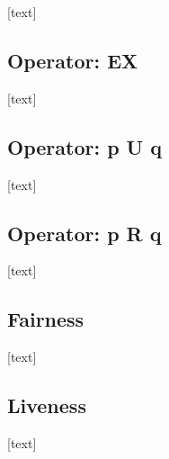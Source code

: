 \documentclass{article}
\begin{document}
		[text]
		
		\subsection{Operator: EX}
				
		[text]
		
		\subsection{Operator: p U q}
				
		[text]
		
		\subsection{Operator: p R q}
				
		[text]
		
		\subsection{Fairness}
				
		[text]
		
		\subsection{Liveness}
			
		[text]
		
	
	\newpage
	
	
	
	
	
\end{document}
